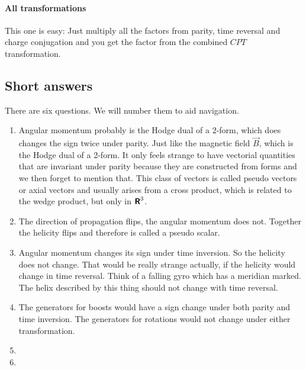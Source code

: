 \documentclass[11pt, english, fleqn, DIV=15, headinclude, BCOR=1cm]{scrartcl}
\begin{document}
\paragraph{All transformations}

This one is easy: Just multiply all the factors from parity, time reversal and
charge conjugation and you get the factor from the combined $CPT$
transformation.

\subsection{Short answers}

There are six questions. We will number them to aid navigation.

\begin{enumerate}
    \item
        Angular momentum probably is the Hodge dual of a 2-form, which does
        changes the sign twice under parity. Just like the magnetic field $\vec
        B$, which is the Hodge dual of a 2-form. It only feels strange to have
        vectorial quantities that are invariant under parity because they are
        constructed from forms and we then forget to mention that. This class
        of vectors is called pseudo vectors or axial vectors and usually arises
        from a cross product, which is related to the wedge product, but only
        in $\text{\bfseries\sffamily R}^3$.

    \item
        The direction of propagation flips, the angular momentum does not.
        Together the helicity flips and therefore is called a pseudo scalar.

    \item
        Angular momentum changes its sign under time inversion. So the helicity
        does not change. That would be really strange actually, if the helicity
        would change in time reversal. Think of a falling gyro which has a
        meridian marked. The helix described by this thing should not change
        with time reversal.

    \item
        The generators for boosts would have a sign change under both parity
        and time inversion. The generators for rotations would not change under
        either transformation.

    \item

    \item
\end{enumerate}
\end{document}
